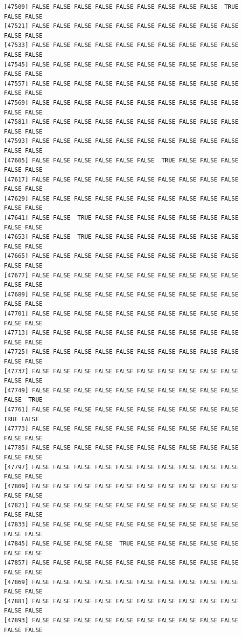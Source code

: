 \documentclass[
  a4paper,
  DIV=11,
  numbers=noendperiod]{scrartcl}
\begin{document}
\begin{verbatim}
[47509] FALSE FALSE FALSE FALSE FALSE FALSE FALSE FALSE FALSE  TRUE FALSE FALSE
[47521] FALSE FALSE FALSE FALSE FALSE FALSE FALSE FALSE FALSE FALSE FALSE FALSE
[47533] FALSE FALSE FALSE FALSE FALSE FALSE FALSE FALSE FALSE FALSE FALSE FALSE
[47545] FALSE FALSE FALSE FALSE FALSE FALSE FALSE FALSE FALSE FALSE FALSE FALSE
[47557] FALSE FALSE FALSE FALSE FALSE FALSE FALSE FALSE FALSE FALSE FALSE FALSE
[47569] FALSE FALSE FALSE FALSE FALSE FALSE FALSE FALSE FALSE FALSE FALSE FALSE
[47581] FALSE FALSE FALSE FALSE FALSE FALSE FALSE FALSE FALSE FALSE FALSE FALSE
[47593] FALSE FALSE FALSE FALSE FALSE FALSE FALSE FALSE FALSE FALSE FALSE FALSE
[47605] FALSE FALSE FALSE FALSE FALSE FALSE  TRUE FALSE FALSE FALSE FALSE FALSE
[47617] FALSE FALSE FALSE FALSE FALSE FALSE FALSE FALSE FALSE FALSE FALSE FALSE
[47629] FALSE FALSE FALSE FALSE FALSE FALSE FALSE FALSE FALSE FALSE FALSE FALSE
[47641] FALSE FALSE  TRUE FALSE FALSE FALSE FALSE FALSE FALSE FALSE FALSE FALSE
[47653] FALSE FALSE  TRUE FALSE FALSE FALSE FALSE FALSE FALSE FALSE FALSE FALSE
[47665] FALSE FALSE FALSE FALSE FALSE FALSE FALSE FALSE FALSE FALSE FALSE FALSE
[47677] FALSE FALSE FALSE FALSE FALSE FALSE FALSE FALSE FALSE FALSE FALSE FALSE
[47689] FALSE FALSE FALSE FALSE FALSE FALSE FALSE FALSE FALSE FALSE FALSE FALSE
[47701] FALSE FALSE FALSE FALSE FALSE FALSE FALSE FALSE FALSE FALSE FALSE FALSE
[47713] FALSE FALSE FALSE FALSE FALSE FALSE FALSE FALSE FALSE FALSE FALSE FALSE
[47725] FALSE FALSE FALSE FALSE FALSE FALSE FALSE FALSE FALSE FALSE FALSE FALSE
[47737] FALSE FALSE FALSE FALSE FALSE FALSE FALSE FALSE FALSE FALSE FALSE FALSE
[47749] FALSE FALSE FALSE FALSE FALSE FALSE FALSE FALSE FALSE FALSE FALSE  TRUE
[47761] FALSE FALSE FALSE FALSE FALSE FALSE FALSE FALSE FALSE FALSE  TRUE FALSE
[47773] FALSE FALSE FALSE FALSE FALSE FALSE FALSE FALSE FALSE FALSE FALSE FALSE
[47785] FALSE FALSE FALSE FALSE FALSE FALSE FALSE FALSE FALSE FALSE FALSE FALSE
[47797] FALSE FALSE FALSE FALSE FALSE FALSE FALSE FALSE FALSE FALSE FALSE FALSE
[47809] FALSE FALSE FALSE FALSE FALSE FALSE FALSE FALSE FALSE FALSE FALSE FALSE
[47821] FALSE FALSE FALSE FALSE FALSE FALSE FALSE FALSE FALSE FALSE FALSE FALSE
[47833] FALSE FALSE FALSE FALSE FALSE FALSE FALSE FALSE FALSE FALSE FALSE FALSE
[47845] FALSE FALSE FALSE FALSE  TRUE FALSE FALSE FALSE FALSE FALSE FALSE FALSE
[47857] FALSE FALSE FALSE FALSE FALSE FALSE FALSE FALSE FALSE FALSE FALSE FALSE
[47869] FALSE FALSE FALSE FALSE FALSE FALSE FALSE FALSE FALSE FALSE FALSE FALSE
[47881] FALSE FALSE FALSE FALSE FALSE FALSE FALSE FALSE FALSE FALSE FALSE FALSE
[47893] FALSE FALSE FALSE FALSE FALSE FALSE FALSE FALSE FALSE FALSE FALSE FALSE

\end{verbatim}
\end{document}
